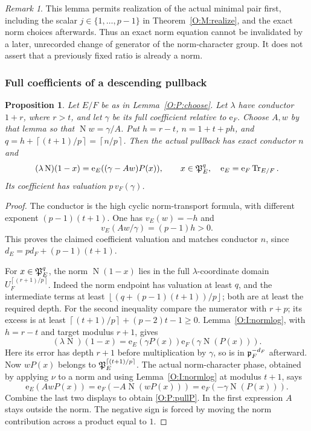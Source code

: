 \documentclass[11pt]{amsart}
\newtheorem{proposition}[theorem]{Proposition}
\theoremstyle{definition}
\theoremstyle{remark}
\newtheorem{remark}[theorem]{Remark}
\newcommand{\Tr}{\operatorname{Tr}}
\newcommand{\Nm}{\operatorname{N}}
\newcommand{\ceil}[1]{\left\lceil #1\right\rceil}
\newcommand{\floor}[1]{\left\lfloor #1\right\rfloor}
\newcommand{\ee}{\mathrm e}\newcommand{\echar}{\mathrm e}\newcommand{\FF}{\mathbf F}
\begin{document}
\begin{remark}
This lemma permits realization of the actual minimal pair first, including
the scalar $j\in\{1,\ldots,p-1\}$ in Theorem~\ref{O:M:realize}, and the exact
norm choices afterwards. Thus an exact norm equation cannot be invalidated
by a later, unrecorded change of generator of the norm-character group.
It does not assert that a previously fixed ratio is already a norm.
\end{remark}

\subsubsection*{Full coefficients of a descending pullback}
\begin{proposition}\label{O:P:pullback}
Let $E/F$ be as in Lemma~\ref{O:P:choose}. Let $\lambda$ have conductor
$1+r$, where $r>t$, and let $\gamma$ be its full coefficient relative
to $\ee_F$. Choose $A,w$ by that lemma so that $\Nm w=\gamma/A$.
Put $h=r-t$, $n=1+t+ph$, and $q=h+\ceil{(t+1)/p}=\ceil{n/p}$.
Then the actual pullback has exact conductor $n$ and
\begin{equation}\label{O:P:pullP}
 (\lambda\Nm)(1-x)=\ee_E((\gamma-Aw)P(x)),
 \qquad x\in\PP_E^q,\quad \ee_E=\ee_F\Tr_{E/F}.
\end{equation}
Its coefficient has valuation $p\,v_F(\gamma)$.
\end{proposition}
\begin{proof}
The conductor is the high cyclic norm-transport formula, with different
exponent $(p-1)(t+1)$. One has $v_E(w)=-h$ and
\[
 v_E(Aw/\gamma)=(p-1)h>0.
\]
This proves the claimed coefficient valuation and matches conductor
$n$, since $d_E=pd_F+(p-1)(t+1)$.

For $x\in\mathfrak P_E^q$, the norm $\Nm(1-x)$ lies in the full
$\lambda$-coordinate domain $U_F^{\ceil{(r+1)/p}}$.
Indeed the norm endpoint has valuation at least $q$, and the
intermediate terms at least
$\floor{(q+(p-1)(t+1))/p}$; both are at least the required depth.
For the second inequality compare the numerator with $r+p$; its
excess is at least $\ceil{(t+1)/p}+(p-2)t-1\ge0$.
Lemma~\ref{O:I:normlog}, with $h=r-t$ and target modulus $r+1$, gives
\[
 (\lambda\Nm)(1-x)
 =\ee_E(\gamma P(x))\ee_F(\gamma\Nm(P(x))).
\]
Here its error has depth $r+1$ before multiplication by $\gamma$,
so is in $\mathfrak p_F^{-d_F}$ afterward.
Now $wP(x)$ belongs to $\PP_E^{\ceil{(t+1)/p}}$.
The actual norm-character phase, obtained by applying $\nu$ to a norm
and using Lemma~\ref{O:I:normlog} at modulus $t+1$, says
\[
 \ee_E(AwP(x))=\ee_F(-A\Nm(wP(x)))
             =\ee_F(-\gamma\Nm(P(x))).
\]
Combine the last two displays to obtain \eqref{O:P:pullP}. In the first
expression $A$ stays outside the norm. The negative sign is forced
by moving the norm contribution across a product equal to $1$.
\end{proof}
\end{document}
